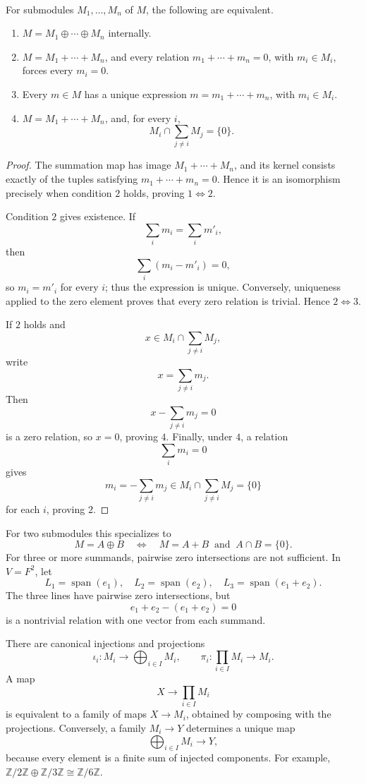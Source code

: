 \begin{proposition}\leavevmode\\
\label{prop:internal-direct-sum-criteria}
For submodules \(M_1,\ldots,M_n\) of \(M\), the following are equivalent.
\begin{enumerate}
\item \(M=M_1\oplus\cdots\oplus M_n\) internally.
\item \(M=M_1+\cdots+M_n\), and every relation
\(m_1+\cdots+m_n=0\), with \(m_i\in M_i\), forces every \(m_i=0\).
\item Every \(m\in M\) has a unique expression
\(m=m_1+\cdots+m_n\), with \(m_i\in M_i\).
\item \(M=M_1+\cdots+M_n\), and, for every \(i\),
\[
M_i\cap\sum_{j\ne i}M_j=\{0\}.
\]
\end{enumerate}
\end{proposition}
\begin{proof}
The summation map has image \(M_1+\cdots+M_n\), and its kernel consists
exactly of the tuples satisfying \(m_1+\cdots+m_n=0\). Hence it is an
isomorphism precisely when condition \(2\) holds, proving
\(1\Longleftrightarrow2\).

Condition \(2\) gives existence. If
\[
\sum_i m_i=\sum_i m'_i,
\]
then
\[
\sum_i(m_i-m'_i)=0,
\]
so \(m_i=m'_i\) for every \(i\); thus the expression is unique. Conversely,
uniqueness applied to the zero element proves that
every zero relation is trivial. Hence \(2\Longleftrightarrow3\).

If \(2\) holds and
\[
x\in M_i\cap\sum_{j\ne i}M_j,
\]
write
\[
x=\sum_{j\ne i}m_j.
\]
Then
\[
x-\sum_{j\ne i}m_j=0
\]
is a zero relation, so \(x=0\), proving \(4\). Finally, under \(4\), a
relation
\[
\sum_i m_i=0
\]
gives
\[
m_i=-\sum_{j\ne i}m_j\in M_i\cap\sum_{j\ne i}M_j=\{0\}
\]
for each \(i\), proving \(2\).
\end{proof}

For two submodules this specializes to
\[
M=A\oplus B\quad\Longleftrightarrow\quad
M=A+B\ \text{ and }\ A\cap B=\{0\}.
\]
For three or more summands, pairwise zero intersections are not sufficient.
In \(V=F^2\), let
\[
L_1=\operatorname{span}(e_1),\quad L_2=\operatorname{span}(e_2),\quad
L_3=\operatorname{span}(e_1+e_2).
\]
The three lines have pairwise zero intersections, but
\[
e_1+e_2-(e_1+e_2)=0
\]
is a nontrivial relation with one vector from each summand.

There are canonical injections and projections
\[
\iota_i:M_i\longrightarrow\bigoplus_{i\in I}M_i,
\qquad
\pi_i:\prod_{i\in I}M_i\longrightarrow M_i.
\]
A map
\[
X\longrightarrow\prod_{i\in I}M_i
\]
is
equivalent to a family of maps \(X\to M_i\), obtained by composing with the
projections. Conversely, a family \(M_i\to Y\) determines a unique map
\[
\bigoplus_{i\in I}M_i\longrightarrow Y,
\]
because every element is a finite sum of injected
components. For example,
\(\mathbb Z/2\mathbb Z\oplus\mathbb Z/3\mathbb Z\cong\mathbb Z/6\mathbb Z\).

